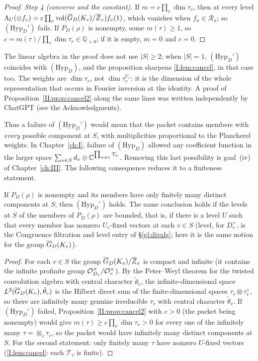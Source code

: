 \begin{proof}
\emph{Step 4 (converse and the constant).} If $m=c\prod_v\dim\tau_v$, then at every level $\Lambda_U(\otimes f_v)=c\prod_v\operatorname{vol}(\overline{G}_D(K_v)/\overline{Z}_v)f_v(1)$, which vanishes when $f_u\in\mathcal R_u$; so $(\mathrm{Hyp}_D')$ fails. If $P_D(\rho)$ is nonempty, some $m(\tau)\ge1$, so $c=m(\tau)/\prod_v\dim\tau_v\in\mathbb Q_{>0}$; if it is empty, $m=0$ and $c=0$.
\end{proof}

\begin{remark}
The linear algebra in the proof does not use $|S|\ge2$; when $|S|=1$, $(\mathrm{Hyp}_D')$ coincides with $(\mathrm{Hyp}_D)$, and the proposition sharpens \cref{I:lem:cancel}, in that case too. The weights are $\dim\tau_v$, not $\dim\tau_v^{U_v}$: it is the dimension of the whole representation that occurs in Fourier inversion at the identity. A proof of Proposition~\ref{II:prop:cancel2} along the same lines was written independently by ChatGPT (see the Acknowledgments).
\end{remark}

Thus a failure of $(\mathrm{Hyp}_D')$ would mean that the packet contains members with \emph{every} possible component at $S$, with multiplicities proportional to the Plancherel weights. In Chapter~\ref{ch:I}, failure of $(\mathrm{Hyp}_D)$ allowed any coefficient function in the larger space $\sum_{v\in S}d_v\otimes\mathbb{C}^{\prod_{w\ne v}\mathcal T_w}$. Removing this last possibility is goal~(iv) of Chapter~\ref{ch:III}. The following consequence reduces it to a finiteness statement.

\begin{corollary}\label{II:cor:finiteStypes}
If $P_D(\rho)$ is nonempty and its members have only finitely many distinct components at $S$, then $(\mathrm{Hyp}_D')$ holds. The same conclusion holds if the levels at $S$ of the members of $P_D(\rho)$ are bounded, that is, if there is a level $U$ such that every member has nonzero $U_v$-fixed vectors at each $v\in S$ (level, for $D_v^\times$, is the Congruence filtration and level entry of \S\ref{gl:divalg}; here it is the same notion for the group $\overline{G}_D(K_v)$).
\end{corollary}
\begin{proof}
For each $v\in S$ the group $\overline{G}_D(K_v)/\overline{Z}_v$ is compact and infinite (it contains the infinite profinite group $\mathcal{O}_{D_v}^\times/\mathcal{O}_v^\times$). By the Peter--Weyl theorem for the twisted convolution algebra with central character $\tilde\theta_v$, the infinite-dimensional space $L^2(\overline{G}_D(K_v),\tilde\theta_v)$ is the Hilbert direct sum of the finite-dimensional spaces $\tau_v\otimes\tau_v^\vee$, so there are infinitely many genuine irreducible $\tau_v$ with central character $\tilde\theta_v$. If $(\mathrm{Hyp}_D')$ failed, Proposition~\ref{II:prop:cancel2} with $c>0$ (the packet being nonempty) would give $m(\tau)\ge c\prod_v\dim\tau_v>0$ for every one of the infinitely many $\tau=\otimes_v\tau_v$, so the packet would have infinitely many distinct components at $S$. For the second statement: only finitely many $\tau$ have nonzero $U$-fixed vectors (\cref{I:lem:cancel}: each $\mathcal T_v$ is finite).
\end{proof}

